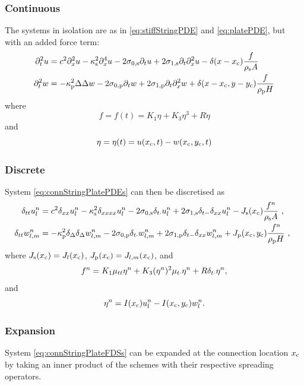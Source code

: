 \subsubsection{Continuous}
The systems in isolation are as in \eqref{eq:stiffStringPDE} and \eqref{eq:platePDE}, but with an added force term:
\begin{subequations}\label{eq:connStringPlatePDEs}
\begin{align}
    \ptt u &= c^2 \pxx u - \kappa_\stxt^2 \pxxxx u - 2\szX[\stxt]\pt u + 2\soX[\stxt] \pt\pxx u - \delta(x-x_\ctxt)\frac{f}{\rho_\stxt A}\\
   \ptt w &= -\kappa_\ptxt^2\Delta\Delta w - 2\szX[\ptxt]\pt w + 2\soX[\ptxt] \pt\pxx w + \delta(x-x_\ctxt, y-y_\ctxt)\frac{f}{ \rho_\ptxt H}
\end{align}
\end{subequations}
where
\begin{equation}
    f = f(t) = K_1\eta+K_3\eta^3+R \dot\eta
\end{equation}
and
\begin{equation}
    \eta = \eta(t) = u(x_{\text{c}}, t) - w(x_{\text{c}}, y_{\text{c}}, t)
\end{equation}

\subsubsection{Discrete}
System \eqref{eq:connStringPlatePDEs} can then be discretised as
\begin{align}\label{eq:connStringPlateFDSs}
    \!\!\!\dtt \uln &= c^2 \dxx \uln - \kappa_\stxt^2 \dxxxx \uln - 2\szX[\stxt]\dtd \uln + 2\soX[\stxt] \dtm\dxx \uln - J_\stxt(x_\ctxt)\frac{f^n}{\rho_\stxt A}\ ,\\
    \!\!\!\dtt \wlmn &= -\kappa_\ptxt^2\dDelta\dDelta \wlmn - 2\szX[\ptxt]\dtd \wlmn + 2\soX[\ptxt] \dtm\dxx \wlmn + J_\ptxt(x_\ctxt, y_\ctxt)\frac{f^n}{ \rho_\ptxt H}\ ,
\end{align}
where $J_\text{s}(x_{\text{c}}) = J_l(x_{\text{c}})$, $J_\text{p}(x_{\text{c}}) = J_{l, m}(x_{\text{c}})$, and
\begin{equation}
    f^n = K_1\mu_{tt}\eta^n+K_3(\eta^n)^2\mu_{t\cdot}\eta^n+R\delta_{t\cdot}\eta^n,
\end{equation}
and
\begin{equation}
    \eta^n = I(x_{\text{c}})u_l^n - I(x_{\text{c}}, y_{\text{c}})w_l^n.
\end{equation}

\subsubsection{Expansion}
System \eqref{eq:connStringPlateFDSs} can be expanded at the connection location $x_{\text{c}}$ by taking an inner product of the schemes with their respective spreading operators. 


